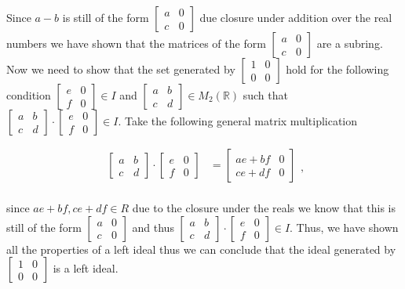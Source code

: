 \documentclass{article}
\begin{document}
      Since $a-b$ is still of the form $\begin{bmatrix}a & 0 \\ c & 0 \end{bmatrix}$ due closure under addition over the real numbers we have shown that the matrices of the form $\begin{bmatrix}a & 0 \\ c & 0 \end{bmatrix}$ are a subring. Now we need to show that the set generated by $\begin{bmatrix}1 & 0 \\ 0 & 0 \end{bmatrix}$ hold for the following condition $\begin{bmatrix}e & 0 \\ f & 0 \end{bmatrix} \in I$ and $\begin{bmatrix}a & b \\ c & d \end{bmatrix} \in M_2(\mathbb{R})$ such that $\begin{bmatrix}a & b \\ c & d \end{bmatrix} \cdot \begin{bmatrix}e & 0 \\ f & 0 \end{bmatrix} \in I$. Take the following general matrix multiplication 

        \[
          \begin{split}
          \begin{bmatrix}a & b \\ c & d \end{bmatrix} \cdot \begin{bmatrix}e & 0 \\ f & 0 \end{bmatrix} &= \begin{bmatrix}ae + bf & 0 \\ ce + df & 0 \end{bmatrix}\\
          \end{split},
        \]
      
      since $ae+bf, ce + df \in R$ due to the closure under the reals we know that this is still of the form $\begin{bmatrix}a & 0 \\ c & 0 \end{bmatrix}$ and thus $\begin{bmatrix}a & b \\ c & d \end{bmatrix} \cdot \begin{bmatrix}e & 0 \\ f & 0 \end{bmatrix} \in I$. Thus, we have shown all the properties of a left ideal thus we can conclude that the ideal generated by $\begin{bmatrix}1 & 0 \\ 0 & 0 \end{bmatrix}$ is a left ideal.
\end{document}
